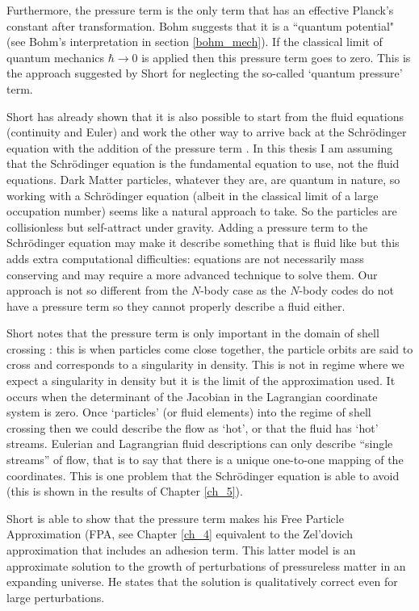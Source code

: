 Furthermore, the pressure term is the only term that has an effective Planck's constant after transformation. Bohm suggests that it is a ``quantum potential" (see Bohm's interpretation in section \ref{bohm_mech}). If the classical limit of quantum mechanics $\hbar \rightarrow 0$ is applied then this pressure term goes to zero. This is the approach suggested by Short \citep{bib_short} for neglecting the so-called `quantum pressure' term.

Short has already shown that it is also possible to start from the fluid equations (continuity and Euler) and work the other way to arrive back at the Schr\"odinger equation with the addition of the pressure term \citep{bib_short}. In this thesis I am assuming that the Schr\"odinger equation is the fundamental equation to use, not the fluid equations. Dark Matter particles, whatever they are, are quantum in nature, so working with a Schr\"odinger equation (albeit in the classical limit of a large occupation number) seems like a natural approach to take. So the particles are collisionless but self-attract under gravity. Adding a pressure term to the Schr\"odinger equation may make it describe something that is fluid like but this adds extra computational difficulties: equations are not necessarily mass conserving and may require a more advanced technique to solve them. Our approach is not so different from the $N$-body case as the $N$-body codes do not have a pressure term so they cannot properly describe a fluid either.

Short notes that the pressure term is only important in the domain of shell crossing \citep{bib_short}: this is when particles come close together, the particle orbits are said to cross and corresponds to a singularity in density. This is not in regime where we expect a singularity in density but it is the limit of the approximation used. It occurs when the determinant of the Jacobian in the Lagrangian coordinate system is zero. Once `particles' (or fluid elements) into the regime of shell crossing then we could describe the flow as `hot', or that the fluid has `hot' streams. Eulerian and Lagrangrian fluid descriptions can only describe ``single streams'' of flow, that is to say that there is a unique one-to-one mapping of the coordinates. This is one problem that the Schr\"odinger equation is able to avoid (this is shown in the results of Chapter \ref{ch_5}).

Short is able to show that the pressure term makes his Free Particle Approximation (FPA, see Chapter \ref{ch_4} equivalent to the Zel'dovich approximation \citep{bib_zel2} that includes an adhesion term. This latter model is an approximate solution to the growth of perturbations of pressureless matter in an expanding universe. He states that the solution is qualitatively correct even for large perturbations.

